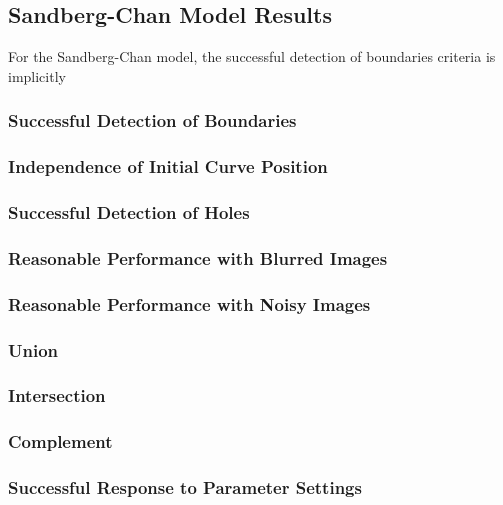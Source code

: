 \documentclass[10pt,twocolumn,letterpaper]{article}
\begin{document}
\subsection{Sandberg-Chan Model Results}

For the Sandberg-Chan model, the successful detection of boundaries criteria is implicitly 



\subsubsection*{Successful Detection of Boundaries}

\subsubsection*{Independence of Initial Curve Position}

\subsubsection*{Successful Detection of Holes}

\subsubsection*{Reasonable Performance with Blurred Images}

\subsubsection*{Reasonable Performance with Noisy Images}

\subsubsection*{Union}

\subsubsection*{Intersection}

\subsubsection*{Complement}

\subsubsection*{Successful Response to Parameter Settings}
\end{document}
